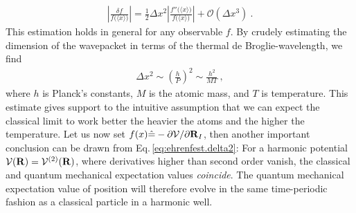 \begin{align}
\left\lvert \frac{\delta f}{f \bm ( \langle x \rangle \bm{)}} \right\rvert
= \frac{1}{2} \Delta x^2 \left\lvert \frac{f'' \bm ( \langle x \rangle \bm{)}}{f \bm ( \langle x \rangle \bm{)}} \right\rvert
+ \mathcal{O}(\Delta x^3)~.
\label{eq:ehrenfest.delta2}
\end{align}
This estimation holds in general for any observable $f$.
By crudely estimating the dimension of the wavepacket in terms of the thermal de Broglie-wavelength, we find
\begin{align}
\Delta x^2 
\sim \left( \frac{h}{P} \right)^2
\sim \frac{h^2}{MT}~,
\label{eq:ehrenfest:dimension}
\end{align}
where $h$ is Planck's constants, $M$ is the atomic mass, and $T$ is temperature. This estimate gives support to the intuitive assumption that we can expect the classical limit to work better the heavier the atoms and the higher the temperature.
Let us now set $f(x) \hat = -\partial \mathcal V / \partial {\bf R}_I$, then another important conclusion can be drawn from Eq.\,\eqref{eq:ehrenfest.delta2}: For a harmonic potential $\mathcal V ({\bf R}) = \mathcal V^{(2)} ({\bf R})$, where derivatives higher than second order vanish, the classical and quantum mechanical expectation values \emph{coincide}. The quantum mechanical expectation value of position will therefore evolve in the same time-periodic fashion as a classical particle in a harmonic well.


\newpage

